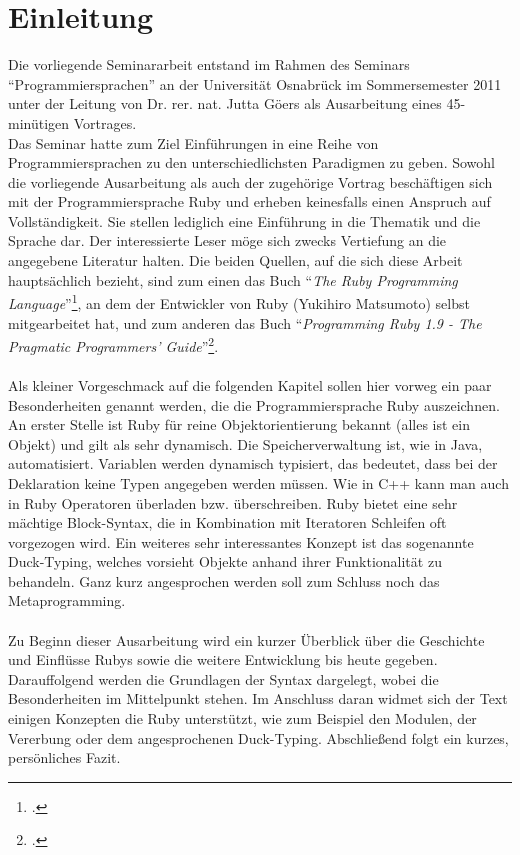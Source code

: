 \documentclass[a4paper, 11pt]{scrreprt}
\begin{document}
\newpage


\onehalfspacing
\thispagestyle{empty}

\tableofcontents
\newpage
\listoffigures
\newpage

\chapter{Einleitung}
Die vorliegende Seminararbeit entstand im Rahmen des Seminars 
``Programmiersprachen'' an der Universität Osnabrück im Sommersemester 2011
unter der Leitung von Dr. rer. nat. Jutta Göers als Ausarbeitung eines 
45-minütigen Vortrages.\\
Das Seminar hatte zum Ziel Einführungen in eine Reihe von Programmiersprachen zu den unterschiedlichsten Paradigmen zu geben. Sowohl die vorliegende Ausarbeitung als auch der zugehörige Vortrag beschäftigen sich mit der Programmiersprache Ruby und erheben keinesfalls einen Anspruch auf Vollständigkeit. Sie stellen lediglich eine Einführung in die Thematik und die Sprache dar. Der interessierte Leser möge sich zwecks Vertiefung an die angegebene Literatur halten. Die beiden Quellen, auf die sich diese Arbeit hauptsächlich bezieht, sind zum einen das Buch ``\textit{The Ruby Programming Language}''\footcite{ruby_lang}, an dem der Entwickler von Ruby (Yukihiro Matsumoto) selbst mitgearbeitet hat, und zum anderen das Buch ``\textit{Programming Ruby 1.9 - The Pragmatic Programmers' Guide}''\footcite{p_ruby}.\\
 \\
Als kleiner Vorgeschmack auf die folgenden Kapitel sollen hier vorweg ein paar Besonderheiten genannt werden, die die Programmiersprache Ruby auszeichnen. An erster Stelle ist Ruby für reine Objektorientierung bekannt (alles ist ein Objekt) und gilt als sehr dynamisch. Die Speicherverwaltung ist, wie in Java, automatisiert. Variablen werden dynamisch typisiert, das bedeutet, dass bei der Deklaration keine Typen angegeben werden müssen. Wie in C++ kann man auch in Ruby Operatoren überladen bzw. überschreiben. Ruby bietet eine sehr mächtige Block-Syntax, die in Kombination mit Iteratoren Schleifen oft vorgezogen wird. Ein weiteres sehr interessantes Konzept ist das sogenannte Duck-Typing, welches vorsieht Objekte anhand ihrer Funktionalität zu behandeln. Ganz kurz angesprochen werden soll zum Schluss noch das Metaprogramming.\\
 \\
Zu Beginn dieser Ausarbeitung wird ein kurzer Überblick über die Geschichte und Einflüsse Rubys sowie die weitere Entwicklung bis heute gegeben. Darauffolgend werden die Grundlagen der Syntax dargelegt, wobei die Besonderheiten im Mittelpunkt stehen. Im Anschluss daran widmet sich der Text einigen Konzepten die Ruby unterstützt, wie zum Beispiel den Modulen, der Vererbung oder dem angesprochenen Duck-Typing.
Abschließend folgt ein kurzes, persönliches Fazit.
\end{document}
